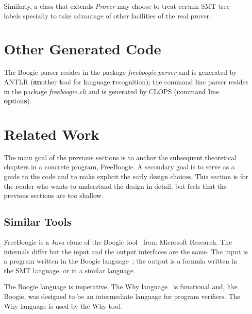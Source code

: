 \documentclass{llncs}
\def\fb#1{{\bf #1}} %
\begin{document}
Similarly, a class that extends \textit{Prover} may choose to
treat certain SMT tree labels specially to take advantage of
other facilities of the real prover.

\section{Other Generated Code} %

The Boogie parser resides in the package
\textit{freeboogie.parser} and is generated by ANTLR
(\textbf{an}other \fb tool for \fb language \fb
recognition); the command line parser resides in the package
\textit{freeboogie.cli} and is generated by CLOPS (\fb command
\fb line \textbf{op}tion\textbf{s}).

\section{Related Work} %

The main goal of the previous sections is to anchor the
subsequent theoretical chapters in a concrete program,
FreeBoogie. A secondary goal is to serve as a guide to the code
and to make explicit the early design choices. This section is
for the reader who wants to understand the design in detail, but
feels that the previous sections are too shallow.

\subsection{Similar Tools} %

FreeBoogie is a Java clone of the Boogie
tool~\cite{barnett2005boogie} from Microsoft Research. The
internals differ but the input and the output interfaces
are the same. The input is a program written in the Boogie
language~\cite{leino2008boogie,leino2010boogie}; the output is a
formula written in the SMT language, or in a similar language.

The Boogie language is imperative. The Why
language~\cite{filliatre2007why} is functional and, like
Boogie, was designed to be an intermediate language for program
verifiers. The Why language is used by the Why tool.
\end{document}
